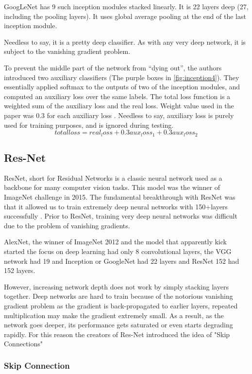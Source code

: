 GoogLeNet has 9 such inception modules stacked linearly. It is 22 layers deep (27, including the pooling layers). It uses global average pooling at the end of the last inception module.

Needless to say, it is a pretty deep classifier. As with any very deep network, it is subject to the vanishing gradient problem.

To prevent the middle part of the network from “dying out”, the authors introduced two auxiliary classifiers (The purple boxes in \cref{fig:inception4}). They essentially applied softmax to the outputs of two of the inception modules, and computed an auxiliary loss over the same labels. The total loss function is a weighted sum of the auxiliary loss and the real loss. Weight value used in the paper was 0.3 for each auxiliary loss \cite{b12}. Needless to say, auxiliary loss is purely used for training purposes, and is ignored during testing.
$$
total loss = real_loss + 0.3 aux_loss_1 + 0.3 aux_loss_2
$$

\subsection{Res-Net}

ResNet, short for Residual Networks is a classic neural network used as a backbone for many computer vision tasks. This model was the winner of ImageNet challenge in 2015. The fundamental breakthrough with ResNet was that it allowed us to train extremely deep neural networks with 150+layers successfully \cite{b13}. Prior to ResNet, training very deep neural networks was difficult due to the problem of vanishing gradients.

AlexNet, the winner of ImageNet 2012 and the model that apparently kick started the focus on deep learning had only 8 convolutional layers, the VGG network had 19 and Inception or GoogleNet had 22 layers and ResNet 152 had 152 layers.

However, increasing network depth does not work by simply stacking layers together. Deep networks are hard to train because of the notorious vanishing gradient problem as the gradient is back-propagated to earlier layers, repeated multiplication may make the gradient extremely small. As a result, as the network goes deeper, its performance gets saturated or even starts degrading rapidly. For this reason the creators of Res-Net introduced the idea of "Skip Connections"

\subsubsection{Skip Connection}

